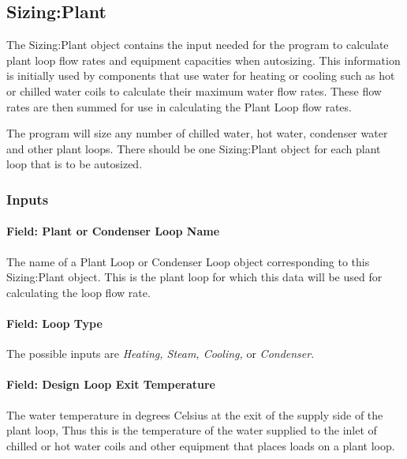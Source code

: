 \subsection{Sizing:Plant}\label{sizingplant}

The Sizing:Plant object contains the input needed for the program to calculate plant loop flow rates and equipment capacities when autosizing. This information is initially used by components that use water for heating or cooling such as hot or chilled water coils to calculate their maximum water flow rates. These flow rates are then summed for use in calculating the Plant Loop flow rates.

The program will size any number of chilled water, hot water, condenser water and other plant loops. There should be one Sizing:Plant object for each plant loop that is to be autosized.

\subsubsection{Inputs}\label{inputs-7-006}

\paragraph{Field: Plant or Condenser Loop Name}\label{field-plant-or-condenser-loop-name}

The name of a Plant Loop or Condenser Loop object corresponding to this Sizing:Plant object. This is the plant loop for which this data will be used for calculating the loop flow rate.

\paragraph{Field: Loop Type}\label{field-loop-type}

The possible inputs are \emph{Heating, Steam, Cooling,} or \emph{Condenser}.

\paragraph{Field: Design Loop Exit Temperature}\label{field-design-loop-exit-temperature}

The water temperature in degrees Celsius at the exit of the supply side of the plant loop, Thus this is the temperature of the water supplied to the inlet of chilled or hot water coils and other equipment that places loads on a plant loop.

